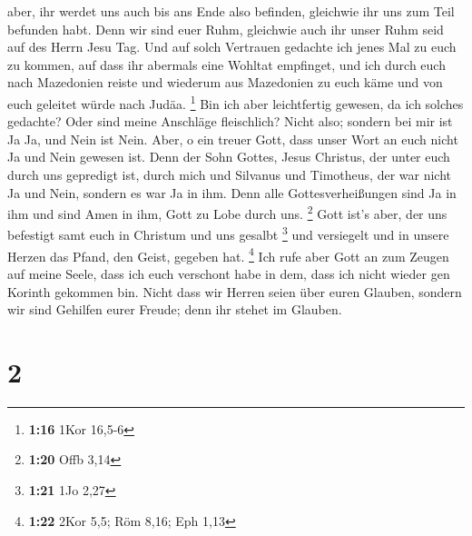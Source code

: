 aber, ihr werdet uns auch bis ans Ende also befinden, gleichwie ihr uns
zum Teil befunden habt.  Denn wir sind euer Ruhm,
gleichwie auch ihr unser Ruhm seid auf des Herrn Jesu Tag.
 Und auf solch Vertrauen gedachte ich jenes Mal zu euch
zu kommen, auf dass ihr abermals eine Wohltat empfinget, 
und ich durch euch nach Mazedonien reiste und wiederum aus Mazedonien zu
euch käme und von euch geleitet würde nach Judäa. \footnote{\textbf{1:16}
  1Kor 16,5-6}  Bin ich aber leichtfertig gewesen, da ich
solches gedachte? Oder sind meine Anschläge fleischlich? Nicht also;
sondern bei mir ist Ja Ja, und Nein ist Nein.  Aber, o
ein treuer Gott, dass unser Wort an euch nicht Ja und Nein gewesen ist.
 Denn der Sohn Gottes, Jesus Christus, der unter euch
durch uns gepredigt ist, durch mich und Silvanus und Timotheus, der war
nicht Ja und Nein, sondern es war Ja in ihm.  Denn alle
Gottesverheißungen sind Ja in ihm und sind Amen in ihm, Gott zu Lobe
durch uns. \footnote{\textbf{1:20} Offb 3,14}  Gott ist's
aber, der uns befestigt samt euch in Christum und uns gesalbt
\footnote{\textbf{1:21} 1Jo 2,27}  und versiegelt und in
unsere Herzen das Pfand, den Geist, gegeben hat. \footnote{\textbf{1:22}
  2Kor 5,5; Röm 8,16; Eph 1,13}  Ich rufe aber Gott an
zum Zeugen auf meine Seele, dass ich euch verschont habe in dem, dass
ich nicht wieder gen Korinth gekommen bin.  Nicht dass
wir Herren seien über euren Glauben, sondern wir sind Gehilfen eurer
Freude; denn ihr stehet im Glauben.

\hypertarget{section-1}{%
\section{2}\label{section-1}}

